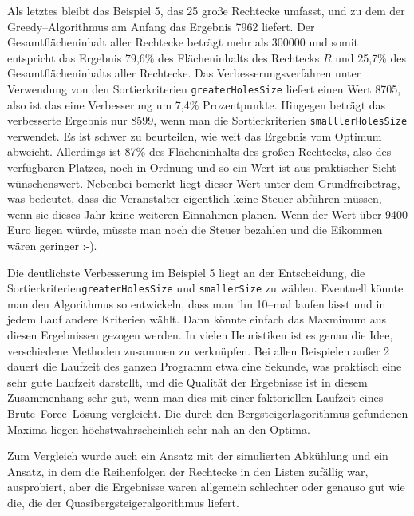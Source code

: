 Als letztes bleibt das Beispiel 5, das 25 große Rechtecke umfasst, und zu dem 
der Greedy--Algorithmus am Anfang das Ergebnis 7962 liefert. 
Der Gesamtflächeninhalt aller Rechtecke beträgt mehr als 300000 und somit
entspricht das Ergebnis 79,6\% des Flächeninhalts des Rechtecks $R$ und
25,7\% des Gesamtflächeninhalts aller Rechtecke.
Das Verbesserungsverfahren unter Verwendung von den Sortierkriterien \texttt{greaterHolesSize}
liefert einen Wert 8705, also ist das eine Verbesserung um 7,4\% Prozentpunkte.
Hingegen beträgt das verbesserte Ergebnis nur 8599, wenn man 
die Sortierkriterien \texttt{smalllerHolesSize} verwendet. 
Es ist schwer zu beurteilen, wie weit das Ergebnis vom Optimum abweicht. 
Allerdings ist 87\% des Flächeninhalts des großen Rechtecks, also des verfügbaren Platzes,
noch in Ordnung und so ein Wert ist aus praktischer Sicht wünschenswert. 
Nebenbei bemerkt liegt dieser Wert unter dem Grundfreibetrag, was bedeutet, dass
die Veranstalter eigentlich keine Steuer abführen müssen,
wenn sie dieses Jahr keine weiteren Einnahmen planen. 
Wenn der Wert über 9400 Euro liegen würde, müsste man noch die 
Steuer bezahlen und die Eikommen wären geringer :-).

Die deutlichste Verbesserung im Beispiel 5 liegt an der Entscheidung,
die Sortierkriterien\break \texttt{greaterHolesSize} und \texttt{smallerSize} zu wählen.
Eventuell könnte man den Algorithmus so entwickeln, dass man ihn 10--mal laufen lässt
und in jedem Lauf andere Kriterien wählt. Dann könnte einfach das Maxmimum aus 
diesen Ergebnissen gezogen werden. In vielen Heuristiken ist es genau die Idee, verschiedene Methoden
zusammen zu verknüpfen.
Bei allen Beispielen außer 2 dauert die Laufzeit des ganzen Programm etwa eine Sekunde,
was praktisch eine sehr gute Laufzeit darstellt, und die Qualität der Ergebnisse 
ist in diesem Zusammenhang sehr gut, wenn man dies mit einer faktoriellen Laufzeit 
eines Brute--Force--Lösung vergleicht. Die durch den Bergsteigerlagorithmus 
gefundenen Maxima liegen höchstwahrscheinlich sehr nah an den Optima.

Zum Vergleich wurde auch ein Ansatz mit der simulierten Abkühlung und ein Ansatz, in
dem die Reihenfolgen der Rechtecke in den Listen zufällig war, ausprobiert, aber
die Ergebnisse waren allgemein schlechter oder genauso gut wie die, die der Quasibergsteigeralgorithmus liefert.

